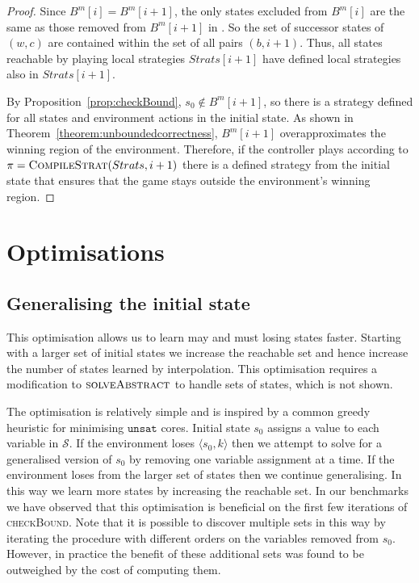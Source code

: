 \begin{proof}
    Since $B^m[i] = B^m[i+1]$, the only states excluded from $B^m[i]$ are the same as those removed from $B^m[i+1]$ in . So the set of successor states of $(w, c)$ are contained within the set of all pairs $(b, i+1)$.  Thus, all states reachable by playing local strategies $Strats[i+1]$ have defined local strategies also in $Strats[i+1]$.

    By Proposition~\ref{prop:checkBound}, $s_0 \not\in B^m[i+1]$, so there is a strategy defined for all states and environment actions in the initial state.  As shown in Theorem~\ref{theorem:unboundedcorrectness}, $B^m[i+1]$ overapproximates the winning region of the environment.  Therefore, if the controller plays according to $\pi = \textsc{CompileStrat}(Strats, i+1)$ there is a defined strategy from the initial state that ensures that the game stays outside the environment's winning region.
\end{proof}

\section{Optimisations}

\subsection{Generalising the initial state}

This optimisation allows us to learn may and must losing states faster.
Starting with a larger set of initial states we increase the reachable set and
hence increase the number of states learned by interpolation. This optimisation
requires a modification to $\textsc{solveAbstract}$ to handle sets of states,
which is not shown.

The optimisation is relatively simple and is inspired by a common greedy heuristic for minimising $\texttt{unsat}$ cores. Initial state $s_0$ assigns a value to each variable in $\mathcal{S}$. If the environment loses $\langle s_0, k \rangle$ then we attempt to solve for a generalised version of $s_0$ by removing one variable assignment at a time. If the environment loses from the larger set of states then we continue generalising. In this way we learn more states by increasing the reachable set. In our benchmarks we have observed that this optimisation is beneficial on the first few iterations of \textsc{checkBound}. Note that it is possible to discover multiple sets in this way by iterating the procedure with different orders on the variables removed from $s_0$. However, in practice the benefit of these additional sets was found to be outweighed by the cost of computing them.

